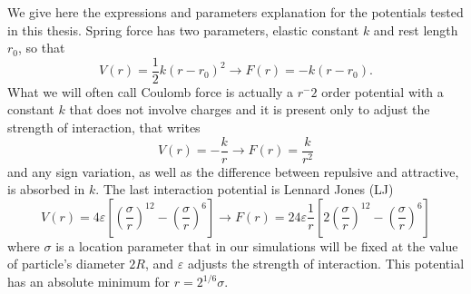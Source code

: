 \documentclass[../../master_thesis_np.tex]{subfiles}
\begin{document}
		
	We give here the expressions and parameters explanation for the potentials tested in this thesis. Spring force has two parameters, elastic constant $k$ and rest length $r_0$, so that 
	\begin{equation}
		V(r) = \frac{1}{2}k (r-r_0)^2 \rightarrow F(r) = -k(r-r_0).
	\end{equation}
	What we will often call Coulomb force is actually a $r^-2$ order potential with a constant $k$ that does not involve charges and it is present only to adjust the strength of interaction, that writes
	\begin{equation}
		V(r) = -\frac{k}{r} \rightarrow F(r) = \frac{k}{r^2}
	\end{equation} 
	and any sign variation, as well as the difference between repulsive and attractive, is absorbed in $k$. The last interaction potential is Lennard Jones (LJ)
	\begin{equation}
		V(r) = 4\varepsilon \left[ \left(\frac{\sigma}{r}\right)^{12} - \left(\frac{\sigma}{r}\right)^{6} \right] \rightarrow F(r) = 24\varepsilon \frac{1}{r}\left[ 2 \left(\frac{\sigma}{r}\right)^{12}  - \left(\frac{\sigma}{r}\right)^{6} \right]
	\end{equation}
	where $\sigma$ is a location parameter that in our simulations will be fixed at the value of particle's diameter $2R$, and $\varepsilon$ adjusts the strength of interaction. This potential has an absolute minimum for $r = 2^{1/6}\sigma$.
	
\end{document}
